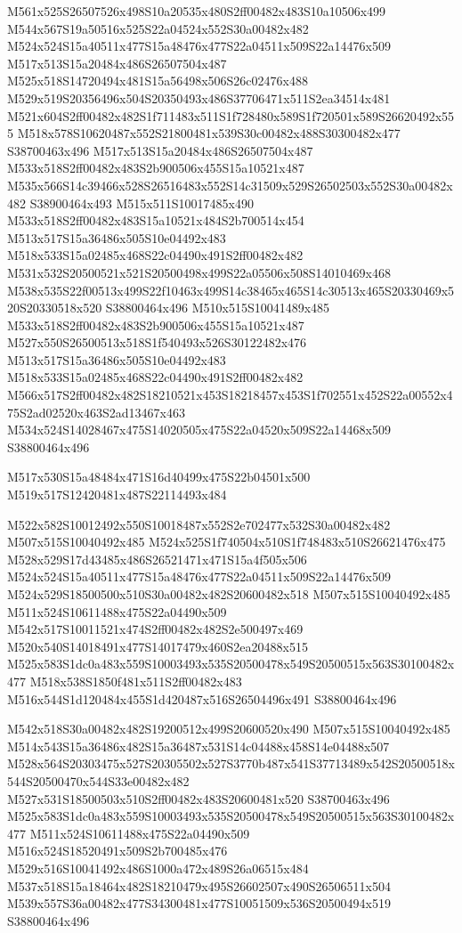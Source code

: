 \documentclass{article}
\begin{document}
\begin{multicols}{2}
M561x525S26507526x498S10a20535x480S2ff00482x483S10a10506x499 M544x567S19a50516x525S22a04524x552S30a00482x482 M524x524S15a40511x477S15a48476x477S22a04511x509S22a14476x509 M517x513S15a20484x486S26507504x487 M525x518S14720494x481S15a56498x506S26c02476x488 M529x519S20356496x504S20350493x486S37706471x511S2ea34514x481 M521x604S2ff00482x482S1f711483x511S1f728480x589S1f720501x589S26620492x555 M518x578S10620487x552S21800481x539S30c00482x488S30300482x477 S38700463x496 M517x513S15a20484x486S26507504x487 M533x518S2ff00482x483S2b900506x455S15a10521x487 M535x566S14c39466x528S26516483x552S14c31509x529S26502503x552S30a00482x482 S38900464x493 M515x511S10017485x490 M533x518S2ff00482x483S15a10521x484S2b700514x454 M513x517S15a36486x505S10e04492x483 M518x533S15a02485x468S22c04490x491S2ff00482x482 M531x532S20500521x521S20500498x499S22a05506x508S14010469x468 M538x535S22f00513x499S22f10463x499S14c38465x465S14c30513x465S20330469x520S20330518x520 S38800464x496 M510x515S10041489x485 M533x518S2ff00482x483S2b900506x455S15a10521x487 M527x550S26500513x518S1f540493x526S30122482x476 M513x517S15a36486x505S10e04492x483 M518x533S15a02485x468S22c04490x491S2ff00482x482 M566x517S2ff00482x482S18210521x453S18218457x453S1f702551x452S22a00552x475S2ad02520x463S2ad13467x463 M534x524S14028467x475S14020505x475S22a04520x509S22a14468x509 S38800464x496

\begin{center}
M517x530S15a48484x471S16d40499x475S22b04501x500 M519x517S12420481x487S22114493x484 
\end{center}


M522x582S10012492x550S10018487x552S2e702477x532S30a00482x482 M507x515S10040492x485 M524x525S1f740504x510S1f748483x510S26621476x475 M528x529S17d43485x486S26521471x471S15a4f505x506 M524x524S15a40511x477S15a48476x477S22a04511x509S22a14476x509 M524x529S18500500x510S30a00482x482S20600482x518 M507x515S10040492x485 M511x524S10611488x475S22a04490x509 M542x517S10011521x474S2ff00482x482S2e500497x469 M520x540S14018491x477S14017479x460S2ea20488x515 M525x583S1dc0a483x559S10003493x535S20500478x549S20500515x563S30100482x477 M518x538S1850f481x511S2ff00482x483 M516x544S1d120484x455S1d420487x516S26504496x491 S38800464x496

M542x518S30a00482x482S19200512x499S20600520x490 M507x515S10040492x485 M514x543S15a36486x482S15a36487x531S14c04488x458S14e04488x507 M528x564S20303475x527S20305502x527S3770b487x541S37713489x542S20500518x544S20500470x544S33e00482x482 M527x531S18500503x510S2ff00482x483S20600481x520 S38700463x496 M525x583S1dc0a483x559S10003493x535S20500478x549S20500515x563S30100482x477 M511x524S10611488x475S22a04490x509 M516x524S18520491x509S2b700485x476 M529x516S10041492x486S1000a472x489S26a06515x484 M537x518S15a18464x482S18210479x495S26602507x490S26506511x504 M539x557S36a00482x477S34300481x477S10051509x536S20500494x519 S38800464x496


\end{multicols}
\end{document}
